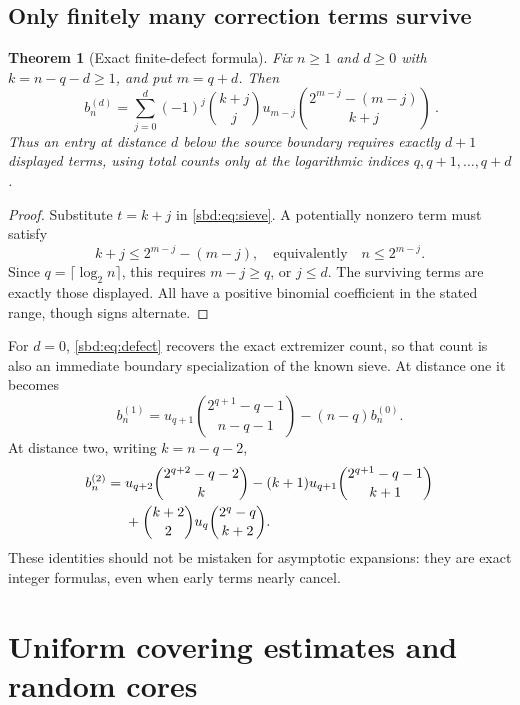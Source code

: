 \documentclass[11pt,a4paper]{article}
\newtheorem{theorem}{Theorem}[section]
\theoremstyle{definition}
\begin{document}
\subsection{Only finitely many correction terms survive}
\begin{theorem}[Exact finite-defect formula]\label{sbd:thm:defect}
Fix $n\ge1$ and $d\ge0$ with $k=n-q-d\ge1$, and put $m=q+d$.
Then
\begin{equation}\label{sbd:eq:defect}
 \boxed{\ b_n^{(d)}=
 \sum_{j=0}^{d}(-1)^j\binom{k+j}{j}
 u_{m-j}\binom{2^{m-j}-(m-j)}{k+j}\ }.
\end{equation}
Thus an entry at distance $d$ below the source boundary requires exactly
$d+1$ displayed terms, using total counts only at the logarithmic indices
$q,q+1,\ldots,q+d$.
\end{theorem}
\begin{proof}
Substitute $t=k+j$ in \eqref{sbd:eq:sieve}. A potentially nonzero term must
satisfy
\[
 k+j\le2^{m-j}-(m-j),\quad\text{equivalently}\quad n\le2^{m-j}.
\]
Since $q=\lceil\log_2n\rceil$, this requires $m-j\ge q$, or $j\le d$.
The surviving terms are exactly those displayed. All have a positive
binomial coefficient in the stated range, though signs alternate.
\end{proof}

For $d=0$, \eqref{sbd:eq:defect} recovers the exact extremizer count, so
that count is also an immediate boundary specialization of the known
sieve. At distance one it becomes
\begin{equation}\label{sbd:eq:d1}
 b_n^{(1)}=u_{q+1}\binom{2^{q+1}-q-1}{n-q-1}
 -(n-q)b_n^{(0)}.
\end{equation}
At distance two, writing $k=n-q-2$,
\begin{align}\label{sbd:eq:d2}
 b_n^{(2)}={}&u_{q+2}\binom{2^{q+2}-q-2}{k}
 -(k+1)u_{q+1}\binom{2^{q+1}-q-1}{k+1}\notag\\
 &+\binom{k+2}{2}u_q\binom{2^q-q}{k+2}.
\end{align}
These identities should not be mistaken for asymptotic expansions:
they are exact integer formulas, even when early terms nearly cancel.

\section{Uniform covering estimates and random cores}
\end{document}
